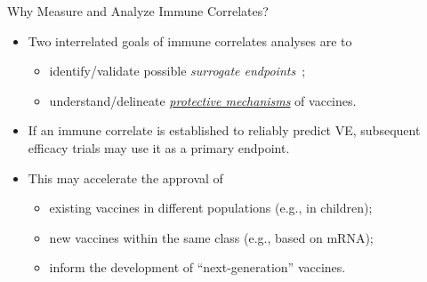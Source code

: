 \documentclass{beamer}
\begin{document}

\begin{frame}[c]{Why Measure and Analyze Immune Correlates?}

\begin{center}
\begin{itemize}
  \itemsep8pt
  \item Two interrelated goals of immune correlates analyses are to
    \begin{itemize}
      \itemsep0pt
      \item identify/validate possible \textit{surrogate
        endpoints}~\citep{prentice1989surrogate};
      \item understand/delineate \underline{\textit{protective mechanisms}} of
        vaccines.
    \end{itemize}
  \item If an immune correlate is established to reliably predict VE,
    subsequent efficacy trials may use it as a primary endpoint.
  \item This may accelerate the approval of
    \begin{itemize}
      \itemsep0pt
      \item existing vaccines in different populations (e.g., in children);
      \item new vaccines within the same class (e.g., based on mRNA);
      \item inform the development of ``next-generation'' vaccines.
    \end{itemize}
\end{itemize}
\end{center}

\note{
}

\end{frame}

\end{document}
